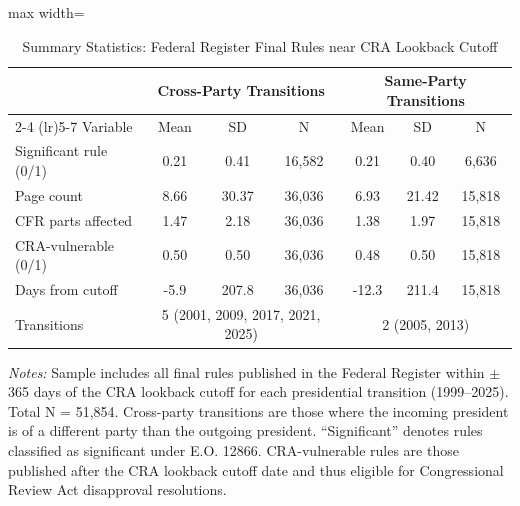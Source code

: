 \begin{table}[H]
\centering
\caption{Summary Statistics: Federal Register Final Rules near CRA Lookback Cutoff}
\label{tab:summary}
\begin{threeparttable}
\begin{adjustbox}{max width=\textwidth}
\begin{tabular}{lcccccc}
\toprule
 & \multicolumn{3}{c}{Cross-Party Transitions} & \multicolumn{3}{c}{Same-Party Transitions} \\
\cmidrule(lr){2-4} \cmidrule(lr){5-7}
Variable & Mean & SD & N & Mean & SD & N \\
\midrule
Significant rule (0/1)              &       0.21 &       0.41 &     16,582 &       0.21 &       0.40 &      6,636 \\
Page count                          &       8.66 &      30.37 &     36,036 &       6.93 &      21.42 &     15,818 \\
CFR parts affected                  &       1.47 &       2.18 &     36,036 &       1.38 &       1.97 &     15,818 \\
CRA-vulnerable (0/1)                &       0.50 &       0.50 &     36,036 &       0.48 &       0.50 &     15,818 \\
Days from cutoff                    &       -5.9 &      207.8 &     36,036 &      -12.3 &      211.4 &     15,818 \\
\midrule
Transitions & \multicolumn{3}{c}{5 (2001, 2009, 2017, 2021, 2025)} & \multicolumn{3}{c}{2 (2005, 2013)} \\
\bottomrule
\end{tabular}
\end{adjustbox}
\begin{tablenotes}[flushleft]
\small
\item \textit{Notes:} Sample includes all final rules published in the Federal Register within $\pm$365 days of the CRA lookback cutoff for each presidential transition (1999--2025). Total N = 51,854. Cross-party transitions are those where the incoming president is of a different party than the outgoing president. ``Significant'' denotes rules classified as significant under E.O. 12866. CRA-vulnerable rules are those published after the CRA lookback cutoff date and thus eligible for Congressional Review Act disapproval resolutions.
\end{tablenotes}
\end{threeparttable}
\end{table}
